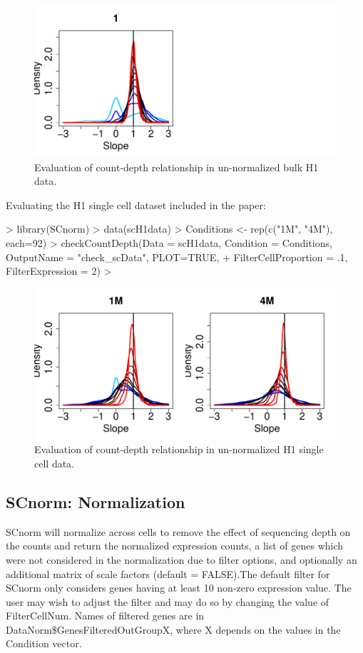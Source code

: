 \documentclass{article}
\begin{document}
\begin{figure}[h!]
\centering
\includegraphics[width=.7\textwidth]{check_bulkData_initial_evaluation}
\caption{Evaluation of count-depth relationship in un-normalized bulk H1 data.}
\end{figure}

Evaluating the H1 single cell dataset included in the paper:
\begin{Schunk}
\begin{Sinput}
> library(SCnorm)
> data(scH1data)
> Conditions <- rep(c("1M", "4M"), each=92)
> checkCountDepth(Data = scH1data, Condition = Conditions, OutputName = "check_scData", PLOT=TRUE, 
+                 FilterCellProportion = .1, FilterExpression = 2)
> 
\end{Sinput}
\end{Schunk}

\begin{figure}[h!]
\centering
\includegraphics[width=.7\textwidth]{check_scData_initial_evaluation}
\caption{Evaluation of count-depth relationship in un-normalized H1 single cell data.}
\end{figure}




  \subsection{SCnorm: Normalization}
\label{sec:Normalization}
SCnorm will normalize across cells to remove the effect of sequencing depth on the counts and return the normalized expression counts, a list of genes which were not considered in the normalization due to filter options, and optionally an additional matrix of scale factors (default = FALSE).The default filter for SCnorm only considers genes having at least 10 non-zero expression value. The user may wish to adjust the filter and may do so by changing the value of FilterCellNum. Names of filtered genes are in DataNorm\$GenesFilteredOutGroupX, where X depends on the values in the Condition vector.
\end{document}
